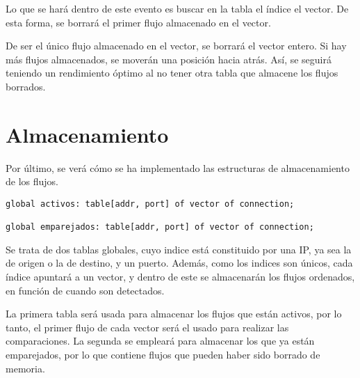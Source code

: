 \intro Lo que se hará dentro de este evento es buscar en la tabla el índice el vector. De esta forma, se borrará el primer flujo almacenado en el vector.

\intro De ser el único flujo almacenado en el vector, se borrará el vector entero. Si hay más flujos almacenados, se moverán una 
posición hacia atrás. Así, se seguirá teniendo un rendimiento óptimo al no tener otra tabla que almacene los flujos borrados.

\section{Almacenamiento}

\intro Por último, se verá cómo se ha implementado las estructuras de almacenamiento de los flujos.

\begin{lstlisting}[style=CodigoC]
global activos: table[addr, port] of vector of connection;

global emparejados: table[addr, port] of vector of connection;
\end{lstlisting}

\intro Se trata de dos tablas globales, cuyo indice está constituido por una IP, ya sea la de origen o la de destino, y un puerto. 
Además, como los indices son únicos, cada índice apuntará a un vector, y dentro de este se almacenarán los flujos ordenados, en 
función de cuando son detectados.

\intro La primera tabla será usada para almacenar los flujos que están activos, por lo tanto, el primer flujo de cada vector será el 
usado para realizar las comparaciones. La segunda se empleará para almacenar los que ya están emparejados, por lo que contiene flujos 
que pueden haber sido borrado de memoria.
